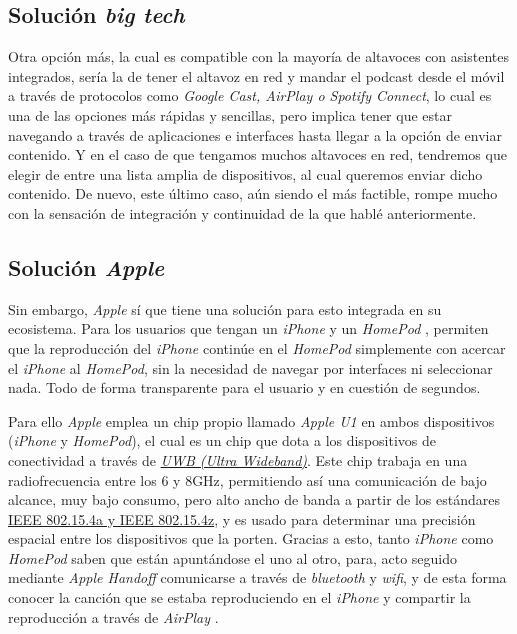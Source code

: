 \subsection{Solución \emph{big tech}}
Otra opción más, la cual es compatible con la mayoría de altavoces con
asistentes integrados, sería la de tener el altavoz en red y mandar el podcast
desde el móvil a través de protocolos como \emph{Google Cast, AirPlay o Spotify
Connect}, lo cual es una de las opciones más rápidas y sencillas, pero implica
tener que estar navegando a través de aplicaciones e interfaces hasta llegar a
la opción de enviar contenido. Y en el caso de que tengamos muchos altavoces en
red, tendremos que elegir de entre una lista amplia de dispositivos, al cual
queremos enviar dicho contenido. De nuevo, este último caso, aún siendo el más
factible, rompe mucho con la sensación de integración y continuidad de la que
hablé anteriormente. 

\subsection{Solución \emph{Apple}} Sin embargo, \emph{Apple} sí que tiene una
solución para esto integrada en su ecosistema. Para los usuarios que tengan un
\emph{iPhone} y un \emph{HomePod} \cite{HomePod}, permiten que la reproducción
del \emph{iPhone} continúe en el \emph{HomePod} simplemente con acercar el
\emph{iPhone} al \emph{HomePod}, sin la necesidad de navegar por interfaces ni
seleccionar nada. Todo de forma transparente para el usuario y en cuestión de
segundos. 

Para ello \emph{Apple} emplea un chip propio llamado \emph{Apple U1} \cite{U1}
en ambos dispositivos (\emph{iPhone} y \emph{HomePod}), el cual es un chip que
dota a los dispositivos de conectividad a través de
\href{https://en.wikipedia.org/wiki/Ultra-wideband}{\emph{UWB (Ultra
Wideband)}}. Este chip trabaja en una radiofrecuencia entre los 6 y 8GHz,
permitiendo así una comunicación de bajo alcance, muy bajo consumo, pero alto
ancho de banda a partir de los estándares
\href{https://es.wikipedia.org/wiki/IEEE_802.15#Grupo_de_trabajo_4_(WPAN_de_baja_velocidad)}{IEEE
802.15.4a y IEEE 802.15.4z}, y es usado para determinar una precisión espacial
entre los dispositivos que la porten. Gracias a esto, tanto \emph{iPhone} como
\emph{HomePod} saben que están apuntándose el uno al otro, para, acto seguido
mediante \emph{Apple Handoff} \cite{Handoff} comunicarse a través de
\emph{bluetooth} y \emph{wifi}, y de esta forma conocer la canción que se estaba
reproduciendo en el \emph{iPhone} y compartir la reproducción a través de
\emph{AirPlay} \cite{AirPlay}.

